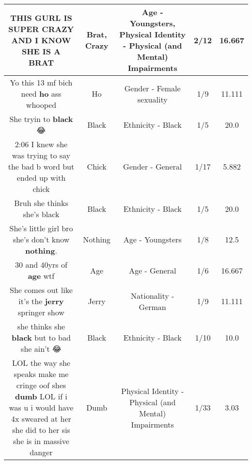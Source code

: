\documentclass[11pt]{article}
\newlength\mylength
\begin{document}
\begin{center}
\begin{longtable}{|C{.65\mylength}|C{.30\mylength}|C{.12\mylength}|C{.12\mylength}|C{.12\mylength}|}
  \small THIS GURL IS SUPER \textbf{CRAZY} AND I KNOW SHE IS A BRAT\normalsize   & Brat, Crazy & Age - Youngsters, Physical Identity - Physical (and Mental) Impairments & 2/12 & 16.667 \\  \hline
  \small Yo this 13 mf bich need \textbf{ho} ass whooped\normalsize   & Ho & Gender - Female sexuality & 1/9 & 11.111 \\  \hline
  \small She tryin to \textbf{black} 😂\normalsize   & Black & Ethnicity - Black & 1/5 & 20.0 \\  \hline
  \small 2:06 I knew she was trying to say the bad b word but ended up with chick\normalsize   & Chick & Gender - General & 1/17 & 5.882 \\  \hline
  \small Bruh she thinks she's black\normalsize   & Black & Ethnicity - Black & 1/5 & 20.0 \\  \hline
  \small She's little girl bro she's don't know  \textbf{nothing}.\normalsize   & Nothing & Age - Youngsters & 1/8 & 12.5 \\  \hline
  \small 30 and 40yrs of \textbf{age} wtf\normalsize   & Age & Age - General & 1/6 & 16.667 \\  \hline
  \small She comes out like it's the \textbf{jerry} springer show\normalsize   & Jerry & Nationality - German & 1/9 & 11.111 \\  \hline
  \small she thinks she \textbf{black} but to bad she ain't 😂\normalsize   & Black & Ethnicity - Black & 1/10 & 10.0 \\  \hline
  \small LOL the way she speaks make me cringe oof shes \textbf{dumb} LOL if i was u i would have 4x sweared at her she did to her sis she is in massive danger\normalsize   & Dumb & Physical Identity - Physical (and Mental) Impairments & 1/33 & 3.03 \\  \hline

\end{longtable}
\end{center}
\end{document}
